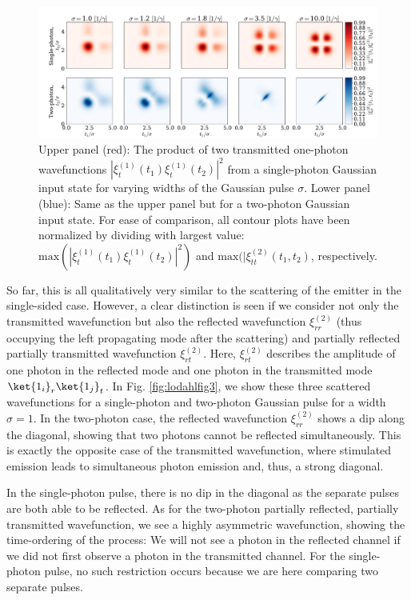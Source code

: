 \begin{figure}[H]
    \centering
    \includegraphics[width=\linewidth]{figures/lodahl_fig2.pdf}
    \caption{Upper panel (red): The product of two transmitted one-photon wavefunctions $|\xi_t^{(1)}(t_1)\xi_t^{(1)}(t_2)|^2$ from a single-photon Gaussian input state for varying widths of the Gaussian pulse $\sigma$. Lower panel (blue): Same as the upper panel but for a two-photon Gaussian input state. For ease of comparison, all contour plots have been normalized by dividing with largest value: $\mathrm{max}(|\xi_t^{(1)}(t_1)\xi_t^{(1)}(t_2)|^2)$ and $\mathrm{max}(|\xi_{tt}^{(2)}(t_1,t_2)$, respectively. \label{fig:lodahlfig2}}
\end{figure}

So far, this is all qualitatively very similar to the scattering of the emitter in the single-sided case. However, a clear distinction is seen if we consider not only the transmitted wavefunction but also the reflected wavefunction $\xi^{(2)}_{rr}$ (thus occupying the left propagating mode after the scattering) and partially reflected partially transmitted wavefunction $\xi^{(2)}_{rt}$. Here, $\xi^{(2)}_{rt}$ describes the amplitude of one photon in the reflected mode and one photon in the transmitted mode $\ket{1_i}_r\ket{1_j}_t$. In Fig. \ref{fig:lodahlfig3}, we show these three scattered wavefunctions for a single-photon and two-photon Gaussian pulse for a width $\sigma = 1$. In the two-photon case, the reflected wavefunction $\xi^{(2)}_{rr}$ shows a dip along the diagonal, showing that two photons cannot be reflected simultaneously. This is exactly the opposite case of the transmitted wavefunction, where stimulated emission leads to simultaneous photon emission and, thus, a strong diagonal.

In the single-photon pulse, there is no dip in the diagonal as the separate pulses are both able to be reflected. As for the two-photon partially reflected, partially transmitted wavefunction, we see a highly asymmetric wavefunction, showing the time-ordering of the process: We will not see a photon in the reflected channel if we did not first observe a photon in the transmitted channel. For the single-photon pulse, no such restriction occurs because we are here comparing two separate pulses.




